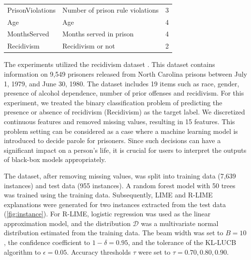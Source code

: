 \documentclass[11pt]{article}
\begin{document}
{\begin{table}[tbp]
\begin{tabular}{llc}
      PrisonViolations       & Number of prison rule violations      & 3                                       \\
      Age                    & Age                                   & 4                                       \\
      MonthsServed           & Months served in prison               & 4                                       \\
      \midrule
      Recidivism             & Recidivism or not                     & 2                                       \\
      \bottomrule
    \end{tabular}
  \end{table}
}

The experiments utilized the recidivism dataset \cite{schmidt1988predicting}.
This dataset contains information on 9,549 prisoners released from
North Carolina prisons between July 1, 1979, and June 30, 1980.
The dataset includes 19 items such as race, gender,
presence of alcohol dependence, number of prior offenses and recidivism.
For this experiment,
we treated the binary classification problem of predicting
the presence or absence of recidivism (Recidivism) as the target label.
We discretized continuous features and removed missing values,
resulting in 15 features.
This problem setting can be considered as a case
where a machine learning model is introduced to decide parole for prisoners.
Since such decisions can have a significant impact on a person's life,
it is crucial for users to interpret the outputs of black-box models appropriately.

The dataset, after removing missing values,
was split into training data (7,639 instances) and test data (955 instances).
A random forest model with 50 trees was trained using the training data.
Subsequently, LIME and R-LIME explanations were generated
for two instances extracted from the test data (\cref{fig:instance}).
For R-LIME, logistic regression was used as the linear approximation model,
and the distribution $\mathcal{D}$ was a multivariate normal distribution
estimated from the training data.
The beam width was set to $B=10$,
the confidence coefficient to $1-\delta=0.95$,
and the tolerance of the KL-LUCB algorithm to $\epsilon=0.05$.
Accuracy thresholds $\tau$ were set to $\tau=0.70,0.80,0.90$.
\end{document}
